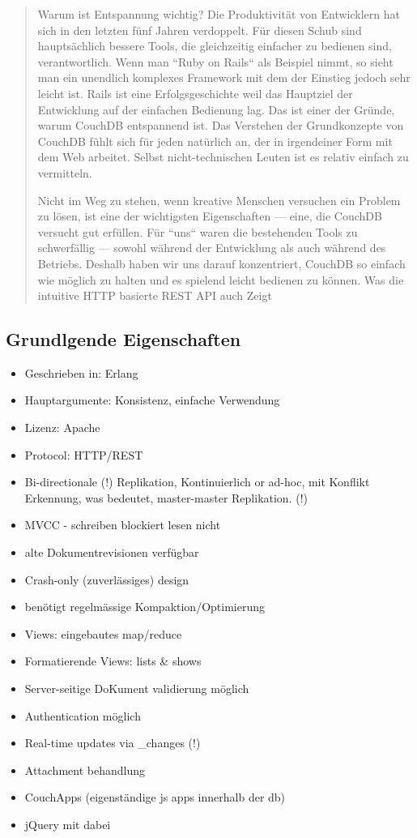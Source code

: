 \begin{quote}
Warum ist Entspannung wichtig? Die Produktivität von Entwicklern hat sich in den letzten fünf Jahren verdoppelt.
Für diesen Schub sind hauptsächlich bessere Tools, die gleichzeitig einfacher zu bedienen sind, verantwortlich.
Wenn man ``Ruby on Rails`` als Beispiel nimmt, so sieht man ein unendlich komplexes Framework mit dem der Einstieg jedoch sehr leicht ist.
Rails ist eine Erfolgsgeschichte weil das Hauptziel der Entwicklung auf der einfachen Bedienung lag.
Das ist einer der Gründe, warum CouchDB entspannend ist.
Das Verstehen der Grundkonzepte von CouchDB fühlt sich für jeden natürlich an, der in irgendeiner Form mit dem Web arbeitet.
Selbst nicht-technischen Leuten ist es relativ einfach zu vermitteln.

Nicht im Weg zu stehen, wenn kreative Menschen versuchen ein Problem zu lösen, ist eine der wichtigsten Eigenschaften — eine,
die CouchDB versucht gut erfüllen. Für ``uns`` waren die bestehenden Tools zu schwerfällig — sowohl während der Entwicklung
als auch während des Betriebs. Deshalb haben wir uns darauf konzentriert,
CouchDB so einfach wie möglich zu halten und es spielend leicht bedienen zu können.
Was die intuitive HTTP basierte REST API auch Zeigt
\end{quote}
\cite[Deutsche Einführung]{couchdb:guide}


\subsection{Grundlgende Eigenschaften}


\begin{itemize}
\item Geschrieben in: Erlang
\item Hauptargumente: Konsistenz, einfache Verwendung
\item Lizenz: Apache
\item Protocol: HTTP/REST
\item Bi-directionale (!) Replikation,
    Kontinuierlich or ad-hoc,
    mit Konflikt Erkennung,
    was bedeutet, master-master Replikation. (!)

\item MVCC - schreiben blockiert lesen nicht
\item alte Dokumentrevisionen verfügbar
\item Crash-only (zuverlässiges) design
\item benötigt regelmässige Kompaktion/Optimierung
\item Views: eingebautes map/reduce
\item Formatierende Views: lists \& shows
\item Server-seitige DoKument validierung möglich
\item Authentication möglich
\item Real-time updates via \_changes (!)
\item Attachment behandlung
\item CouchApps (eigenständige js apps innerhalb der db)
\item jQuery mit dabei
\end{itemize}
~ \cite{web:db-compare}


